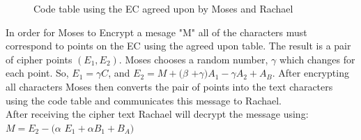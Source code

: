 \begin{figure}[H]
	  \caption{\label{fig:DH:DHKE_17} Code table using the EC agreed upon by Moses and Rachael }
\end{figure}

In order for Moses to Encrypt a mesage "M" all of the characters must correspond to points on the EC using the agreed upon table.  The result is a pair of cipher points $(E_1, E_2)$.  Moses chooses a random number, $\gamma$ which changes for each point. So,
$E_1 =$$\gamma$$C$, and $E_2 = M +($$\beta$ $+$$\gamma$$)$$A_1 -$$\gamma$$A_2 + A_B$. After encrypting all characters Moses then converts the pair of points into the text characters using the code table and communicates this message to Rachael.\\

After receiving the cipher text Rachael will decrypt the message using:\\
$M = E_2 - ($$\alpha$ $E_1 +$$\alpha$$B_1 +B_A)$\\

